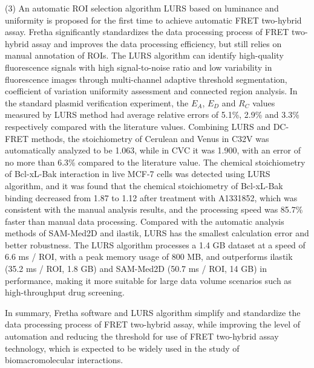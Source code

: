 \begin{eabstract}
(3) An automatic ROI selection algorithm LURS based on luminance and uniformity is proposed for the first time to achieve automatic FRET two-hybrid assay.
Fretha significantly standardizes the data processing process of FRET two-hybrid assay and improves the data processing efficiency, but still relies on manual annotation of ROIs.
The LURS algorithm can identify high-quality fluorescence signals with high signal-to-noise ratio and low variability in fluorescence images through multi-channel adaptive threshold segmentation, coefficient of variation uniformity assessment and connected region analysis.
In the standard plasmid verification experiment, the $E_{A}$, $E_{D}$ and $R_C$ values measured by LURS method had average relative errors of 5.1\%, 2.9\% and 3.3\% respectively compared with the literature values.
Combining LURS and DC-FRET methods, the stoichiometry of Cerulean and Venus in C32V was automatically analyzed to be 1.063, while in CVC it was 1.900, with an error of no more than 6.3\% compared to the literature value.
The chemical stoichiometry of Bcl-xL-Bak interaction in live MCF-7 cells was detected using LURS algorithm, and it was found that the chemical stoichiometry of Bcl-xL-Bak binding decreased from 1.87 to 1.12 after treatment with A1331852, which was consistent with the manual analysis results, and the processing speed was 85.7\% faster than manual data processing.
Compared with the automatic analysis methods of SAM-Med2D and ilastik, LURS has the smallest calculation error and better robustness.
The LURS algorithm processes a 1.4 GB dataset at a speed of 6.6 ms / ROI, with a peak memory usage of 800 MB, and outperforms ilastik (35.2 ms / ROI, 1.8 GB) and SAM-Med2D (50.7 ms / ROI, 14 GB) in performance, making it more suitable for large data volume scenarios such as high-throughput drug screening.

In summary, Fretha software and LURS algorithm simplify and standardize the data processing process of FRET two-hybrid assay, while improving the level of automation and reducing the threshold for use of FRET two-hybrid assay technology, which is expected to be widely used in the study of biomacromolecular interactions.
\end{eabstract}

